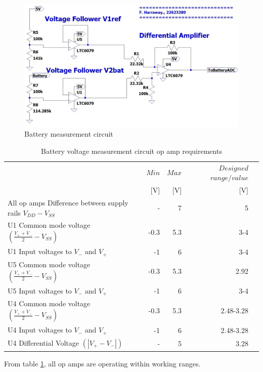 \begin{figure}[!htb]
	\centering
	\includegraphics[width=0.5\linewidth]{Figures/A6/Batterysig.jpg}
	\caption{Battery measurement circuit}
	\label{fig:batcirc}
\end{figure}


\begin{table}[!htb]
	\centering
	\footnotesize
	\caption[Battery voltage measurement circuit op amp requirements]{Battery voltage measurement circuit op amp requirements \cite{MCP}}
	\begin{tabular}{lrrrr}
		\toprule
		& $Min$ &$Max$&$Designed$ $range / value$\\
		&[V]&[V]&[V]\\
		\midrule
		All op amps Difference between supply rails $V_{DD} - V_{SS}$ & -& 7  &5   \\
		
		U1 Common mode voltage $(\frac{V_+ + V_-}{2}-V_{SS})$ &  -0.3&5.3&3-4\\
		U1 Input voltages to $V_-$ and $V_+$  &  -1    &6& 3-4 \\
		
		U5 Common mode voltage $(\frac{V_+ + V_-}{2}-V_{SS})$ &  -0.3&5.3&2.92\\
		U5 Input voltages to $V_-$ and $V_+$ &  -1    &6& 3-4 \\
		
		
		U4 Common mode voltage $(\frac{V_+ + V_-}{2}-V_{SS})$ &  -0.3&5.3&2.48-3.28\\
		U4 Input voltages to $V_-$ and $V_+$  &  -1    &6&2.48-3.28 \\
		U4 Differential Voltage $ (|V_+ - V_-|)$ & -& 5&  3.28  \\
		
		\bottomrule
	\end{tabular}
	\label{tab:MCPbat}
\end{table}

From table \ref{tab:MCPbat}, all op amps are operating within working ranges.

